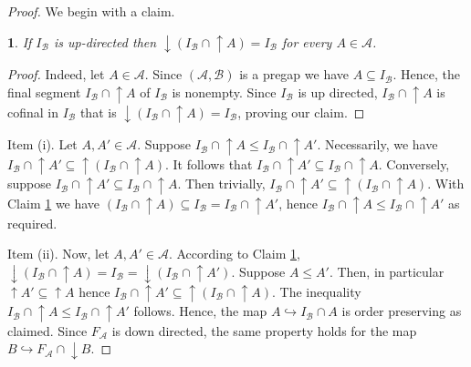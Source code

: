 \documentclass[12pt]{amsart}
\newtheorem{claim}[definition]{\noindent {\bf Claim}}
\begin{document}
\begin{proof} We begin with a claim. 

\begin{claim} \label{claim:gap3} 
If $I_{\mathcal B}$ is up-directed then ${\downarrow \!\!} (I_{\mathcal
B}\cap {\uparrow \!\!} A)= I_{\mathcal B}$ for every $A \in \mathcal A$.
\end{claim}

\begin{proof}
Indeed, let $A\in \mathcal A$. Since $(\mathcal A, \mathcal B)$ is a
pregap we have $A \subseteq I_{\mathcal B}$. Hence, the final segment
$ I_{\mathcal B} \cap {\uparrow \!\!} A$ of $I_{\mathcal B}$ is
nonempty. Since $I_{\mathcal B}$ is up directed, $ I_{\mathcal B}
\cap {\uparrow \!\!} A$ is cofinal in $I_{\mathcal B}$ that is
${\downarrow \!\!} (I_{\mathcal B} \cap {\uparrow \!\!} A)= I_{\mathcal
B}$, proving our claim.
\end{proof}

Item (i). Let $A, A' \in \mathcal A$. Suppose $I_{\mathcal B} \cap
{\uparrow \!\!} A\leq I_{\mathcal B} \cap {\uparrow \!\!}
A'$. Necessarily, we have $I_{\mathcal B} \cap {\uparrow \!\!} A'
\subseteq {\uparrow \!\!} (I_{\mathcal B} \cap {\uparrow \!\!} A)$. It
follows that $I_{\mathcal B} \cap {\uparrow \!\!} A' \subseteq
I_{\mathcal B} \cap {\uparrow \!\!} A$. Conversely, suppose $I_{\mathcal
B} \cap {\uparrow \!\!} A' \subseteq I_{\mathcal B} \cap {\uparrow \!\!}
A$. Then trivially, $I_{\mathcal B} \cap {\uparrow \!\!} A' \subseteq
{\uparrow \!\!} (I_{\mathcal B} \cap {\uparrow \!\!} A)$. With Claim
\ref{claim:gap3} we have $(I_{\mathcal B} \cap {\uparrow \!\!}
A)\subseteq I_{\mathcal B}=I_{\mathcal B} \cap {\uparrow \!\!} A'$,
hence $I_{\mathcal B} \cap {\uparrow \!\!} A\leq I_{\mathcal B} \cap
{\uparrow \!\!} A'$ as required.

Item (ii).  Now, let $A, A' \in \mathcal A$. According to Claim
\ref{claim:gap3}, ${\downarrow \!\!} (I_{\mathcal B}\cap {\uparrow \!\!}
A)=I_{\mathcal B}=\downarrow(I_{\mathcal B}\cap {\uparrow \!\!} A')$.
Suppose $A\leq A'$.  Then, in particular ${\uparrow \!\!} A'\subseteq
{\uparrow \!\!} A$ hence $I_{\mathcal B}\cap {\uparrow \!\!} A'\subseteq
{\uparrow \!\!} (I_{\mathcal B} \cap {\uparrow \!\!} A)$. The inequality
$I_{\mathcal B} \cap {\uparrow \!\!} A\leq I_{\mathcal B} \cap
{\uparrow \!\!} A'$ follows.  Hence, the map $A\hookrightarrow
I_{\mathcal B} \cap A$ is order preserving as claimed. Since
$F_{\mathcal A}$ is down directed, the same property holds for the map
$B\hookrightarrow F_{\mathcal A}\cap {\downarrow \!\!} B$.


\end{proof}
\end{document}
